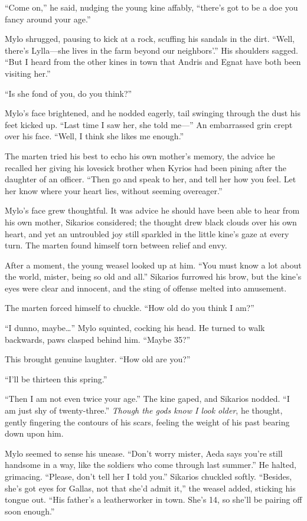 ``Come on,'' he said, nudging the young kine affably, ``there's got to be a doe you fancy around your age.''

Mylo shrugged, pausing to kick at a rock, scuffing his sandals in the dirt. ``Well, there's Lylla---she lives in the farm beyond our neighbors'.'' His shoulders sagged. ``But I heard from the other kines in town that Andris and Egnat have both been visiting her.''

``Is she fond of you, do you think?''

Mylo's face brightened, and he nodded eagerly, tail swinging through the dust his feet kicked up. ``Last time I saw her, she told me---'' An embarrassed grin crept over his face. ``Well, I think she likes me enough.''

The marten tried his best to echo his own mother's memory, the advice he recalled her giving his lovesick brother when Kyrios had been pining after the daughter of an officer. ``Then go and speak to her, and tell her how you feel. Let her know where your heart lies, without seeming overeager.''

Mylo's face grew thoughtful. It was advice he should have been able to hear from his own mother, Sikarios considered; the thought drew black clouds over his own heart, and yet an untroubled joy still sparkled in the little kine's gaze at every turn. The marten found himself torn between relief and envy.

After a moment, the young weasel looked up at him. ``You must know a lot about the world, mister, being so old and all.'' Sikarios furrowed his brow, but the kine's eyes were clear and innocent, and the sting of offense melted into amusement.

The marten forced himself to chuckle. ``How old do you think I am?''

``I dunno, maybe\ldots'' Mylo squinted, cocking his head. He turned to walk backwards, paws clasped behind him. ``Maybe 35?''

This brought genuine laughter. ``How old are you?''

``I'll be thirteen this spring.''

``Then I am not even twice your age.'' The kine gaped, and Sikarios nodded. ``I am just shy of twenty-three.'' \emph{Though the gods know I look older}, he thought, gently fingering the contours of his scars, feeling the weight of his past bearing down upon him.

Mylo seemed to sense his unease. ``Don't worry mister, Aeda says you're still handsome in a way, like the soldiers who come through last summer.'' He halted, grimacing. ``Please, don't tell her I told you.'' Sikarios chuckled softly. ``Besides, she's got eyes for Gallas, not that she'd admit it,'' the weasel added, sticking his tongue out. ``His father's a leatherworker in town. She's 14, so she'll be pairing off soon enough.''

